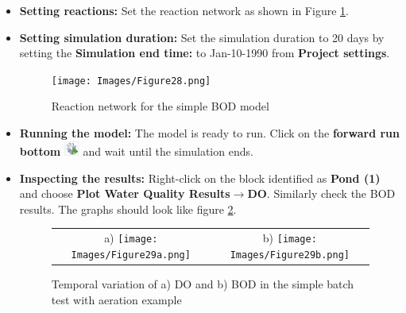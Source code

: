 \begin{itemize}
\item \textbf{Setting reactions: } Set the reaction network as shown in Figure \ref{fig:28}.
\item \textbf{Setting simulation duration: } Set the simulation duration to 20 days by setting the \textbf{Simulation end time: } to Jan-10-1990 from \textbf{Project settings}. 
\begin{figure}
\begin{center}
\texttt{[image: Images/Figure28.png]} \\
\caption{Reaction network for the simple BOD model}\label{fig:28}
\end{center}
\end{figure}

\item \textbf{Running the model: }The model is ready to run. Click on the \textbf{forward run bottom} \includegraphics[width=0.5cm]{Icons/run_icon.png} and wait until the simulation ends. 

\item \textbf{Inspecting the results: } Right-click on the block identified as \textbf{Pond (1)} and choose \textbf{Plot Water Quality Results}$\rightarrow$\textbf{DO}. Similarly check the BOD results. The graphs should look like figure \ref{fig:29}.
\begin{figure}
\begin{center}
\begin{tabular}{c c}
a) \texttt{[image: Images/Figure29a.png]} & b) \texttt{[image: Images/Figure29b.png]}\\
\end{tabular}
\caption{Temporal variation of a) DO and b) BOD in the simple batch test with aeration example}\label{fig:29}
\end{center}
\end{figure}

\end{itemize}